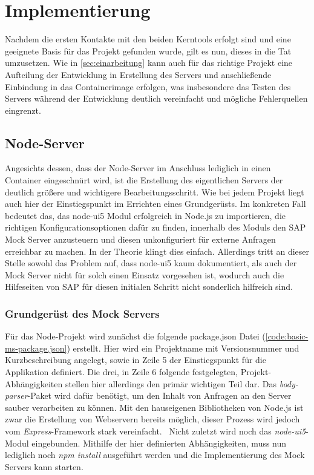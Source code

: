 \chapter{Implementierung}
Nachdem die ersten Kontakte mit den beiden Kerntools erfolgt sind und eine geeignete Basis für das Projekt gefunden wurde, gilt es nun, dieses in die Tat umzusetzen.
Wie in \autoref{sec:einarbeitung} kann auch für das richtige Projekt eine Aufteilung der Entwicklung in Erstellung des Servers und anschließende Einbindung in das Containerimage erfolgen, was insbesondere das Testen des Servers während der Entwicklung deutlich vereinfacht und mögliche Fehlerquellen eingrenzt.

\section{Node-Server}
Angesichts dessen, dass der Node-Server im Anschluss lediglich in einen Container eingeschnürt wird, ist die Erstellung des eigentlichen Servers der deutlich größere und wichtigere Bearbeitungsschritt.
Wie bei jedem Projekt liegt auch hier der Einstiegspunkt im Errichten eines Grundgerüsts.
Im konkreten Fall bedeutet das, das node-ui5 Modul erfolgreich in Node.js zu importieren, die richtigen Konfigurationsoptionen dafür zu finden, innerhalb des Moduls den SAP Mock Server anzusteuern und diesen unkonfiguriert für externe Anfragen erreichbar zu machen.
In der Theorie klingt dies einfach.
Allerdings tritt an dieser Stelle sowohl das Problem auf, dass node-ui5 kaum dokumentiert, als auch der Mock Server nicht für solch einen Einsatz vorgesehen ist, wodurch auch die Hilfeseiten von SAP für diesen initialen Schritt nicht sonderlich hilfreich sind.

\subsection{Grundgerüst des Mock Servers}
\label{subsec:foundation}
Für das Node-Projekt wird zunächst die folgende package.json Datei (\autoref{code:basic-ms-package.json}) erstellt.
Hier wird ein Projektname mit Versionsnummer und Kurzbeschreibung angelegt, sowie in Zeile 5 der Einstiegspunkt für die Applikation definiert.
Die drei, in Zeile 6 folgende festgelegten, Projekt-Abhängigkeiten stellen hier allerdings den primär wichtigen Teil dar.
Das \emph{body-parser}-Paket wird dafür benötigt, um den Inhalt von Anfragen an den Server sauber verarbeiten zu können.
Mit den hauseigenen Bibliotheken von Node.js ist zwar die Erstellung von Webservern bereits möglich, dieser Prozess wird jedoch vom \emph{Express}-Framework stark vereinfacht.~\cite{express}
Nicht zuletzt wird noch das \emph{node-ui5}-Modul eingebunden.
Mithilfe der hier definierten Abhängigkeiten, muss nun lediglich noch \emph{npm install} ausgeführt werden und die Implementierung des Mock Servers kann starten.


